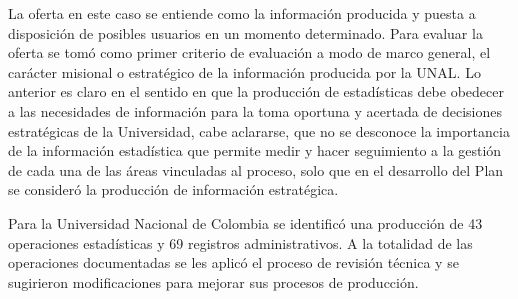\documentclass[
]{book}
\begin{document}
La oferta en este caso se entiende como la información producida y puesta a disposición de
posibles usuarios en un momento determinado. Para evaluar la oferta se tomó como primer
criterio de evaluación a modo de marco general, el carácter misional o estratégico de la
información producida por la UNAL. Lo anterior es claro en el sentido en que la producción de
estadísticas debe obedecer a las necesidades de información para la toma oportuna y acertada de
decisiones estratégicas de la Universidad, cabe aclararse, que no se desconoce la importancia de la
información estadística que permite medir y hacer seguimiento a la gestión de cada una de las
áreas vinculadas al proceso, solo que en el desarrollo del Plan se consideró la producción de
información estratégica.

Para la Universidad Nacional de Colombia se identificó una producción de 43 operaciones
estadísticas y 69 registros administrativos. A la totalidad de las operaciones documentadas se les
aplicó el proceso de revisión técnica y se sugirieron modificaciones para mejorar sus procesos de
producción.
\end{document}
